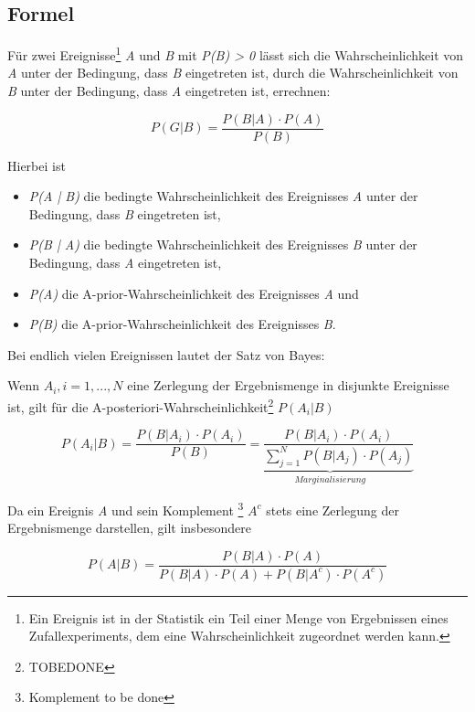 \subsection{Formel}

Für zwei Ereignisse\footnote{Ein Ereignis ist in der Statistik ein Teil einer Menge von Ergebnissen eines Zufallexperiments, dem eine Wahrscheinlichkeit zugeordnet
werden kann.} \textit{A} und \textit{B} mit \textit{P(B) > 0} lässt sich die Wahrscheinlichkeit von \textit{A} unter der Bedingung, dass \textit{B} eingetreten
ist, durch die Wahrscheinlichkeit von \textit{B} unter der Bedingung, dass \textit{A} eingetreten ist, errechnen:

\begin{equation}
    P(G | B) = \frac{P(B | A) \cdot P(A)}{P(B)}
\end{equation}

Hierbei ist

\begin{itemize}
    \item \textit{P(A | B)} die bedingte Wahrscheinlichkeit des Ereignisses \textit{A} unter der Bedingung, dass \textit{B} eingetreten ist,
    \item \textit{P(B | A)} die bedingte Wahrscheinlichkeit des Ereignisses \textit{B} unter der Bedingung, dass \textit{A} eingetreten ist,
    \item \textit{P(A)} die A-prior-Wahrscheinlichkeit des Ereignisses \textit{A} und
    \item \textit{P(B)} die A-prior-Wahrscheinlichkeit des Ereignisses \textit{B}.
\end{itemize}

Bei endlich vielen Ereignissen lautet der Satz von Bayes:

Wenn \textit{$A_i, i = 1,..., N$} eine Zerlegung der Ergebnismenge in disjunkte Ereignisse ist, gilt für die A-posteriori-Wahrscheinlichkeit\footnote{TOBEDONE}
 \textit{$P(A_i | B)$}

\begin{equation}
    P(A_i | B) = \frac{P(B | A_i) \cdot P(A_i)}{P(B)} \underbrace{= \frac{P(B | A_i) \cdot P(A_i)}{\sum_{j = 1}^{N} P(B | A_j) \cdot P(A_j)}}_{Marginalisierung}
\end{equation}

Da ein Ereignis \textit{A} und sein Komplement \footnote{Komplement to be done} \textit{$A^c$} stets eine Zerlegung der Ergebnismenge darstellen, gilt insbesondere

\begin{equation}
    P(A | B) = \frac{P(B | A) \cdot P(A)}{P(B | A) \cdot P(A) + P(B | A^c) \cdot P(A^c)}
\end{equation}

\cite[S.411f]{Papulla:2014}
